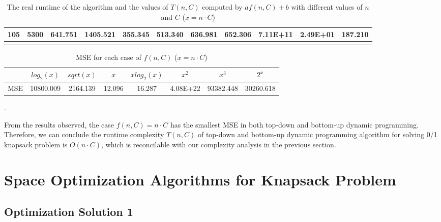 \documentclass{article}
\begin{document}
\begin{center}
\begin{longtable}{|c|c|c|c|c|c|c|c|c|c|c|}
105	&	5300	&	641.751	&	1405.521	&	355.345	&	513.340	&	636.981	&	652.306	&	7.11E+11	&	2.49E+01	&	187.210	\\	\hline
     \caption{The real runtime of the algorithm and the values of $T(n,C)$ computed by $af(n,C) + b$ with different values of $n$ and $C$ ($x = n\cdot C$)}
    \end{longtable}
\begin{table}[ht]
    \begin{adjustbox}{width=1.1\textwidth,center}
         \begin{tabular}{|c|c|c|c|c|c|c|c|}
        \hline
        {} & $log_2(x)$ & $sqrt(x)$ & $x$ & $xlog_2(x)$ & $x^2$ & $x^3$ & $2^x$ \\
        \hline
        MSE & 10800.009	&	2164.139	&	12.096	&	16.287	&	4.08E+22	&	93382.448	&	30260.618  \\  \hline
        \end{tabular}
    \end{adjustbox}
    \caption{MSE for each case of $f(n,C)$ ($x = n\cdot C$)}. 
\end{table}    
\end{center}

\indent From the results observed, the case $f(n,C) = n \cdot C$ has the smallest MSE in both top-down and bottom-up dynamic programming. Therefore, we can conclude the runtime complexity $T(n,C)$ of top-down and bottom-up dynamic programming algorithm for solving 0/1 knapsack problem is $O(n \cdot C)$, which is reconcilable with our complexity analysis in the previous section. 

\section{Space Optimization Algorithms for Knapsack Problem}
\subsection{Optimization Solution 1}
\end{document}
